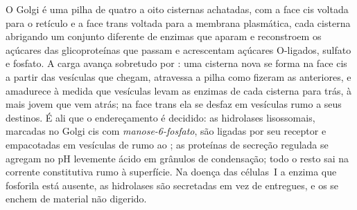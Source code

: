\begin{proposition}[O Golgi]\label{prop:b3:membrane-traffic:golgi}
O Golgi é uma pilha de quatro a oito cisternas achatadas, com a face
cis voltada para o retículo e a face trans voltada para a membrana
plasmática, cada cisterna abrigando um conjunto diferente de enzimas
que aparam e reconstroem os açúcares das glicoproteínas que passam e
acrescentam açúcares O-ligados, sulfato e fosfato. A carga avança
sobretudo por \emph{}: uma cisterna nova se
forma na face cis a partir das vesículas que chegam, atravessa a pilha
como fizeram as anteriores, e amadurece à medida que vesículas 
levam as enzimas de cada cisterna para trás, à mais jovem que vem
atrás; na face trans ela se desfaz em vesículas rumo a seus destinos.
É ali que o endereçamento é decidido: as hidrolases lisossomais,
marcadas no Golgi cis com \emph{manose-6-fosfato}, são ligadas por seu
receptor e empacotadas em vesículas de  rumo ao ; as
proteínas de secreção regulada se agregam no pH levemente ácido em
grânulos de condensação; todo o resto sai na corrente constitutiva rumo
à superfície. Na doença das células~I a enzima que fosforila está
ausente, as hidrolases são secretadas em vez de entregues, e os
 se enchem de material não digerido.
\end{proposition}

